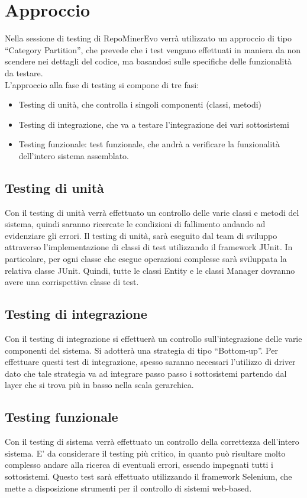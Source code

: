 \chapter{Approccio}
Nella sessione di testing di RepoMinerEvo verrà utilizzato un approccio di tipo ``Category Partition'', che prevede che i test vengano effettuati in maniera da non scendere nei dettagli del codice, ma basandosi sulle specifiche delle funzionalità da testare.\\
L’approccio alla fase di testing si compone di tre fasi:\\
\begin{itemize}
\item Testing di unità, che controlla i singoli componenti (classi, metodi)\\
\item Testing di integrazione, che va a testare l'integrazione dei vari sottosistemi\\
\item Testing funzionale: test funzionale, che andrà a verificare la funzionalità dell’intero sistema assemblato.\\
\end{itemize}
\section{Testing di unità}
Con il testing di unità verrà effettuato un controllo delle varie classi e metodi del sistema, quindi saranno ricercate le condizioni di fallimento andando ad evidenziare gli errori. Il testing di unità, sarà eseguito dal team di sviluppo attraverso l’implementazione di classi di test utilizzando il framework JUnit. In particolare, per ogni classe che esegue operazioni complesse sarà sviluppata la relativa classe JUnit. Quindi, tutte le classi Entity e le classi Manager dovranno avere una corrispettiva classe di test.\\

\section{Testing di integrazione}
Con il testing di integrazione si effettuerà un controllo sull’integrazione delle varie componenti del sistema. Si adotterà una strategia di tipo “Bottom-up”. Per effettuare questi test di integrazione, spesso saranno necessari l’utilizzo di driver dato che tale strategia va ad integrare passo passo i sottosistemi partendo dal layer che si trova più in basso nella scala gerarchica.\\

\section{Testing funzionale}
Con il testing di sistema verrà effettuato un controllo della correttezza dell’intero sistema.  E’ da considerare il testing più critico, in quanto può risultare molto complesso andare alla ricerca di eventuali errori, essendo impegnati tutti i sottosistemi. Questo test sarà effettuato utilizzando il framework Selenium, che mette a disposizione strumenti per il controllo di sistemi web-based.